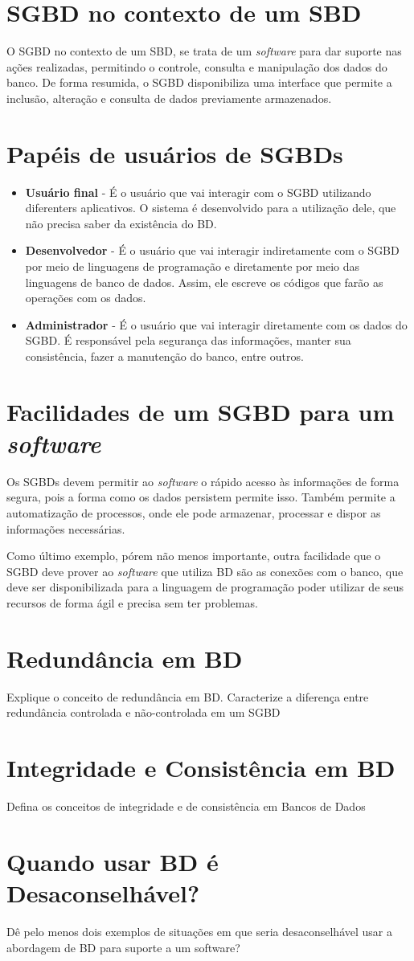 \documentclass[12pt]{article}
\begin{document}
\section{SGBD no contexto de um SBD}
O SGBD no contexto de um SBD, se trata de um \textit{software} para dar suporte nas ações realizadas, permitindo o controle, consulta e manipulação dos dados do banco. De forma resumida, o SGBD disponibiliza uma interface que permite a inclusão, alteração e consulta de dados previamente armazenados.

\section{Papéis de usuários de SGBDs}
\begin{itemize}
    \item \textbf{Usuário final} - É o usuário que vai interagir com o SGBD utilizando diferenters aplicativos. O sistema é desenvolvido para a utilização dele, que não precisa saber da existência do BD.
    \item \textbf{Desenvolvedor} - É o usuário que vai interagir indiretamente com o SGBD por meio de linguagens de programação e diretamente por meio das linguagens de banco de dados. Assim, ele escreve os códigos que farão as operações com os dados.
    \item \textbf{Administrador} - É o usuário que vai interagir diretamente com os dados do SGBD. É responsável pela segurança das informações, manter sua consistência, fazer a manutenção do banco, entre outros.
\end{itemize}

\section{Facilidades de um SGBD para um \textit{software}}
Os SGBDs devem permitir ao \textit{software} o rápido acesso às informações de forma segura, pois a forma como os dados persistem permite isso. Também permite a automatização de processos, onde ele pode armazenar, processar e dispor as informações necessárias.

Como último exemplo, pórem não menos importante, outra facilidade que o SGBD deve prover ao \textit{software} que utiliza BD são as conexões com o banco, que deve ser disponibilizada para a linguagem de programação poder utilizar de seus recursos de forma ágil e precisa sem ter problemas.

\section{Redundância em BD}
Explique o conceito de redundância em BD. Caracterize a diferença entre redundância controlada e não-controlada em um SGBD

\section{Integridade e Consistência em BD}
Defina os conceitos de integridade e de consistência em Bancos de Dados

\section{Quando usar BD é Desaconselhável?}
Dê pelo menos dois exemplos de situações em que seria desaconselhável usar a abordagem de BD para suporte a um software?
\end{document}
